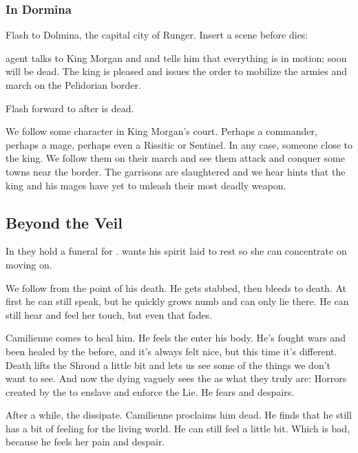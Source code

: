 \subsubsection{In Dormina}
Flash to Dolmina, the capital city of Runger. 
Insert a scene before \Icor{} dies: 

 agent talks to King Morgan and and tells him that everything is in motion; soon \Icor{} will be dead. 
The king is pleased and issues the order to mobilize the armies and march on the Pelidorian border.

Flash forward to after \Icor{} is dead. 

We follow some character in King Morgan's court. 
Perhaps a commander, perhaps a mage, perhaps even a Rissitic or Sentinel. 
In any case, someone close to the king. 
We follow them on their march and see them attack and conquer some towns near the border. 
The garrisons are slaughtered and we hear hints that the king and his mages have yet to unleash their most deadly weapon. 









\subsection{Beyond the Veil}
In \Malcur they hold a funeral for \Icor. \Tiroco{} wants his spirit laid to rest so she can concentrate on moving on. 

We follow \Icor{} from the point of his death. He gets stabbed, then bleeds to death. At first he can still speak, but he quickly grows numb and can only lie there. He can still hear \Tiroco{} and feel her touch, but even that fades. 

Camilienne comes to heal him. He feels the \Sephiroth{} enter his body. He's fought wars and been healed by the \Sephiroth{} before, and it's always felt nice, but this time it's different. Death lifts the Shroud a little bit and lets us see some of the things we don't want to see. And now the dying \Icor{} vaguely sees the \Sephiroth{} as what they truly are: Horrors created by the \banes{} to enslave \humanity{} and enforce the Lie. He fears and despairs. 

After a while, the \Sephiroth{} dissipate. Camilienne proclaims him dead. He finds that he still has a bit of feeling for the living world. He can still feel \Tiroco{} a little bit. Which is bad, because he feels her pain and despair. 

